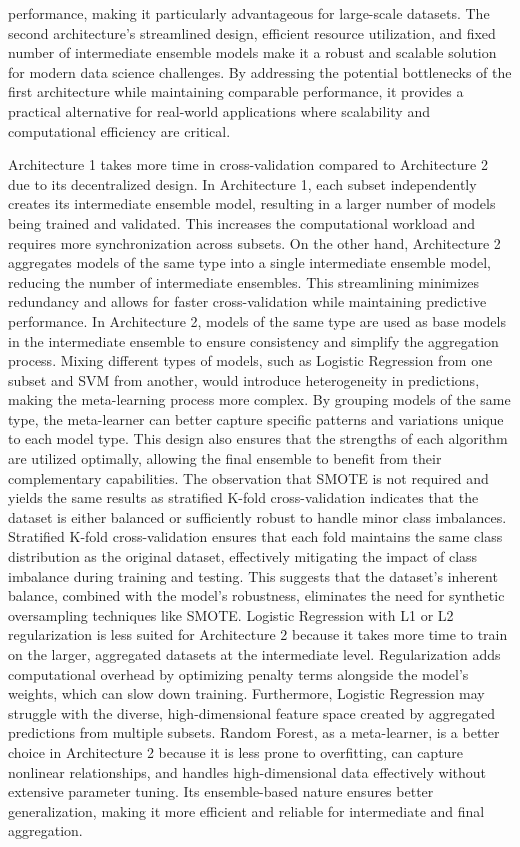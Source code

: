 performance, making it particularly advantageous for large-scale datasets. The second architecture's streamlined design, efficient resource utilization, and fixed number of intermediate ensemble models make it a robust and scalable solution for modern data science challenges. By addressing the potential bottlenecks of the first architecture while maintaining comparable performance, it provides a practical alternative for real-world applications where scalability and computational efficiency are critical.

\vspace{1em}

\noindent
Architecture 1 takes more time in cross-validation compared to Architecture 2 due to its decentralized design. In Architecture 1, each subset independently creates its intermediate ensemble model, resulting in a larger number of models being trained and validated. This increases the computational workload and requires more synchronization across subsets. On the other hand, Architecture 2 aggregates models of the same type into a single intermediate ensemble model, reducing the number of intermediate ensembles. This streamlining minimizes redundancy and allows for faster cross-validation while maintaining predictive performance. In Architecture 2, models of the same type are used as base models in the intermediate ensemble to ensure consistency and simplify the aggregation process. Mixing different types of models, such as Logistic Regression from one subset and SVM from another, would introduce heterogeneity in predictions, making the meta-learning process more complex. By grouping models of the same type, the meta-learner can better capture specific patterns and variations unique to each model type. This design also ensures that the strengths of each algorithm are utilized optimally, allowing the final ensemble to benefit from their complementary capabilities. The observation that SMOTE is not required and yields the same results as stratified K-fold cross-validation indicates that the dataset is either balanced or sufficiently robust to handle minor class imbalances. Stratified K-fold cross-validation ensures that each fold maintains the same class distribution as the original dataset, effectively mitigating the impact of class imbalance during training and testing. This suggests that the dataset's inherent balance, combined with the model’s robustness, eliminates the need for synthetic oversampling techniques like SMOTE. Logistic Regression with L1 or L2 regularization is less suited for Architecture 2 because it takes more time to train on the larger, aggregated datasets at the intermediate level. Regularization adds computational overhead by optimizing penalty terms alongside the model's weights, which can slow down training. Furthermore, Logistic Regression may struggle with the diverse, high-dimensional feature space created by aggregated predictions from multiple subsets. Random Forest, as a meta-learner, is a better choice in Architecture 2 because it is less prone to overfitting, can capture nonlinear relationships, and handles high-dimensional data effectively without extensive parameter tuning. Its ensemble-based nature ensures better generalization, making it more efficient and reliable for intermediate and final aggregation.

